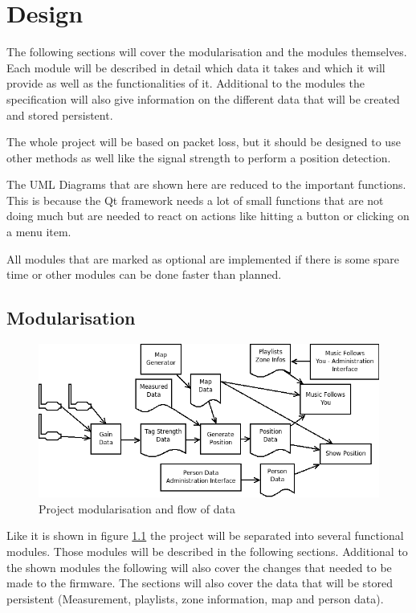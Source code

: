 \chapter{Design}
  The following sections will cover the modularisation and the modules themselves. Each module will be described in detail which data it takes and which it will provide as well as the functionalities of it. Additional to the modules the specification will also give information on the different data that will be created and stored persistent.

  The whole project will be based on packet loss, but it should be designed to use other methods as well like the signal strength to perform a position detection.

  The UML Diagrams that are shown here are reduced to the important functions. This is because the Qt framework needs a lot of small functions that are not doing much but are needed to react on actions like hitting a button or clicking on a menu item.

  All modules that are marked as optional are implemented if there is some spare time or other modules can be done faster than planned.

  \section{Modularisation}
  \label{sec:design:modularisation}
   \begin{figure}[h]
    \includegraphics[scale=0.6]{Diagrams/projectStructure.png}
    \caption{Project modularisation and flow of data}
    \label{fg:projectModularization}
   \end{figure}

   Like it is shown in figure \ref{fg:projectModularization} the project will be separated into several functional modules. Those modules will be described in the following sections. Additional to the shown modules the following will also cover the changes that needed to be made to the firmware. The sections will also cover the data that will be stored persistent (Measurement, playlists, zone information, map and person data).

